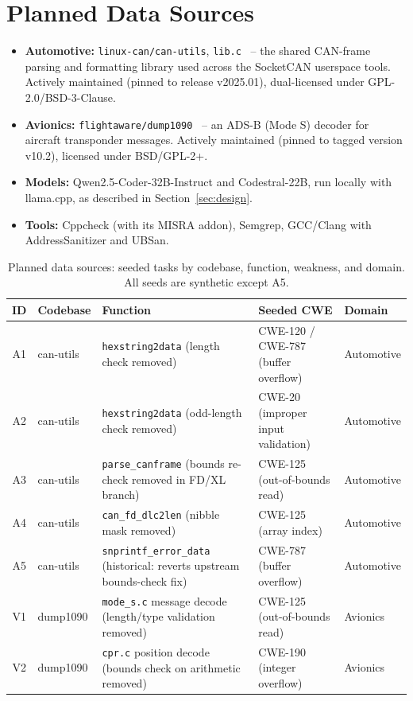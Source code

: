 \documentclass[12pt]{article}
\begin{document}
\section{Planned Data Sources}
\label{sec:data}
\begin{itemize}
    \item \textbf{Automotive:} \texttt{linux-can/can-utils}, \texttt{lib.c}~\citep{canutils} -- the shared CAN-frame parsing and formatting library used across the SocketCAN userspace tools. Actively maintained (pinned to release v2025.01), dual-licensed under GPL-2.0/BSD-3-Clause.
    \item \textbf{Avionics:} \texttt{flightaware/dump1090}~\citep{dump1090} -- an ADS-B (Mode S) decoder for aircraft transponder messages. Actively maintained (pinned to tagged version v10.2), licensed under BSD/GPL-2+.
    \item \textbf{Models:} Qwen2.5-Coder-32B-Instruct and Codestral-22B, run locally with llama.cpp, as described in Section~\ref{sec:design}.
    \item \textbf{Tools:} Cppcheck (with its MISRA addon), Semgrep, GCC/Clang with AddressSanitizer and UBSan.
\end{itemize}

\begin{table}[H]
    \centering
    \small
    \begin{tabular}{|c|l|p{4.2cm}|p{3.6cm}|l|}
        \hline
        \textbf{ID} & \textbf{Codebase} & \textbf{Function} & \textbf{Seeded CWE} & \textbf{Domain} \\
        \hline
        A1 & can-utils & \texttt{hexstring2data} (length check removed) & CWE-120 / CWE-787 (buffer overflow) & Automotive \\
        \hline
        A2 & can-utils & \texttt{hexstring2data} (odd-length check removed) & CWE-20 (improper input validation) & Automotive \\
        \hline
        A3 & can-utils & \texttt{parse\_canframe} (bounds re-check removed in FD/XL branch) & CWE-125 (out-of-bounds read) & Automotive \\
        \hline
        A4 & can-utils & \texttt{can\_fd\_dlc2len} (nibble mask removed) & CWE-125 (array index) & Automotive \\
        \hline
        A5 & can-utils & \texttt{snprintf\_error\_data} (historical: reverts upstream bounds-check fix) & CWE-787 (buffer overflow) & Automotive \\
        \hline
        V1 & dump1090 & \texttt{mode\_s.c} message decode (length/type validation removed) & CWE-125 (out-of-bounds read) & Avionics \\
        \hline
        V2 & dump1090 & \texttt{cpr.c} position decode (bounds check on arithmetic removed) & CWE-190 (integer overflow) & Avionics \\
        \hline
    \end{tabular}
    \caption{Planned data sources: seeded tasks by codebase, function, weakness, and domain. All seeds are synthetic except A5.}
    \label{tab:tasks}
\end{table}
\end{document}
